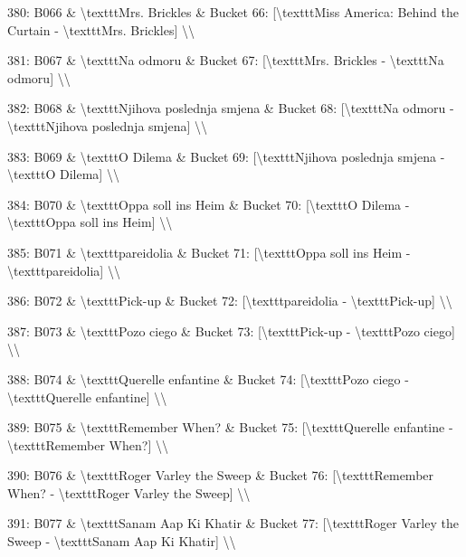 \documentclass[11pt,a4paper]{article}
\begin{document}
380: B066 \& \textbackslash{}texttt{Mrs. Brickles} \& Bucket 66: [\textbackslash{}texttt{Miss America: Behind the Curtain} - \textbackslash{}texttt{Mrs. Brickles}] \textbackslash{}\textbackslash{}

381: B067 \& \textbackslash{}texttt{Na odmoru} \& Bucket 67: [\textbackslash{}texttt{Mrs. Brickles} - \textbackslash{}texttt{Na odmoru}] \textbackslash{}\textbackslash{}

382: B068 \& \textbackslash{}texttt{Njihova poslednja smjena} \& Bucket 68: [\textbackslash{}texttt{Na odmoru} - \textbackslash{}texttt{Njihova poslednja smjena}] \textbackslash{}\textbackslash{}

383: B069 \& \textbackslash{}texttt{O Dilema} \& Bucket 69: [\textbackslash{}texttt{Njihova poslednja smjena} - \textbackslash{}texttt{O Dilema}] \textbackslash{}\textbackslash{}

384: B070 \& \textbackslash{}texttt{Oppa soll ins Heim} \& Bucket 70: [\textbackslash{}texttt{O Dilema} - \textbackslash{}texttt{Oppa soll ins Heim}] \textbackslash{}\textbackslash{}

385: B071 \& \textbackslash{}texttt{pareidolia} \& Bucket 71: [\textbackslash{}texttt{Oppa soll ins Heim} - \textbackslash{}texttt{pareidolia}] \textbackslash{}\textbackslash{}

386: B072 \& \textbackslash{}texttt{Pick-up} \& Bucket 72: [\textbackslash{}texttt{pareidolia} - \textbackslash{}texttt{Pick-up}] \textbackslash{}\textbackslash{}

387: B073 \& \textbackslash{}texttt{Pozo ciego} \& Bucket 73: [\textbackslash{}texttt{Pick-up} - \textbackslash{}texttt{Pozo ciego}] \textbackslash{}\textbackslash{}

388: B074 \& \textbackslash{}texttt{Querelle enfantine} \& Bucket 74: [\textbackslash{}texttt{Pozo ciego} - \textbackslash{}texttt{Querelle enfantine}] \textbackslash{}\textbackslash{}

389: B075 \& \textbackslash{}texttt{Remember When?} \& Bucket 75: [\textbackslash{}texttt{Querelle enfantine} - \textbackslash{}texttt{Remember When?}] \textbackslash{}\textbackslash{}

390: B076 \& \textbackslash{}texttt{Roger Varley the Sweep} \& Bucket 76: [\textbackslash{}texttt{Remember When?} - \textbackslash{}texttt{Roger Varley the Sweep}] \textbackslash{}\textbackslash{}

391: B077 \& \textbackslash{}texttt{Sanam Aap Ki Khatir} \& Bucket 77: [\textbackslash{}texttt{Roger Varley the Sweep} - \textbackslash{}texttt{Sanam Aap Ki Khatir}] \textbackslash{}\textbackslash{}
\end{document}
